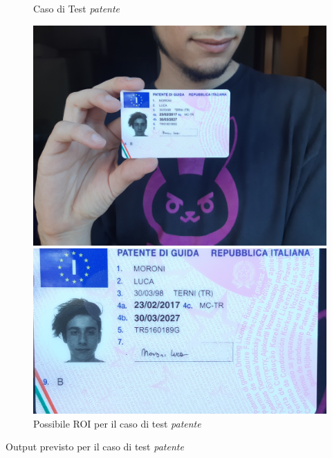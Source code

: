 \documentclass[12pt,a4paper]{article}
\begin{document}
\begin{figure}[H]
    \begin{minipage}{0.48\textwidth}
        \centering
        \caption{Caso di Test \textit{patente}}
        \includegraphics[width=\textwidth]{test_patente.jpg}
    \end{minipage}\hfill
    \begin{minipage}{0.48\textwidth}
        \centering
        \caption{Possibile ROI per il caso di test \textit{patente}}
        \includegraphics[width=\textwidth]{test_patente_snapshot.jpg}
    \end{minipage}
\end{figure}

\begin{listing}[H]
    \caption{Output previsto per il caso di test \textit{patente}}
    \inputminted{python}{test_patente.py}
\end{listing}
\end{document}
